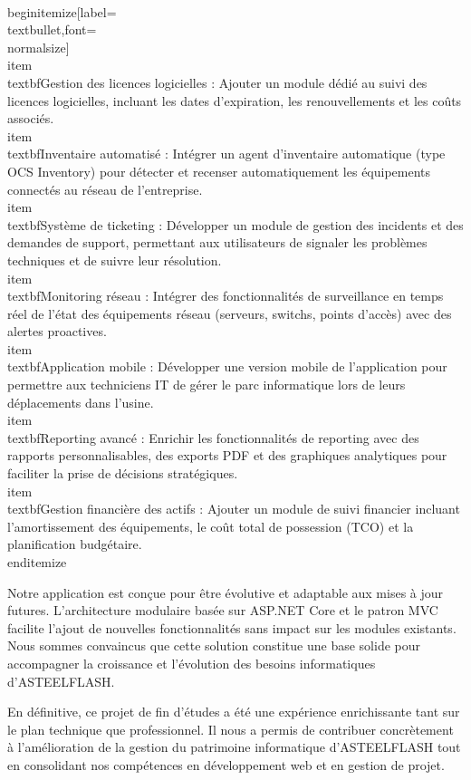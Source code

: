 \\begin{itemize}[label=\\textbullet,font=\\normalsize]
    \\item \\textbf{Gestion des licences logicielles :} Ajouter un module dédié au suivi des licences logicielles, incluant les dates d'expiration, les renouvellements et les coûts associés.
    \\item \\textbf{Inventaire automatisé :} Intégrer un agent d'inventaire automatique (type OCS Inventory) pour détecter et recenser automatiquement les équipements connectés au réseau de l'entreprise.
    \\item \\textbf{Système de ticketing :} Développer un module de gestion des incidents et des demandes de support, permettant aux utilisateurs de signaler les problèmes techniques et de suivre leur résolution.
    \\item \\textbf{Monitoring réseau :} Intégrer des fonctionnalités de surveillance en temps réel de l'état des équipements réseau (serveurs, switchs, points d'accès) avec des alertes proactives.
    \\item \\textbf{Application mobile :} Développer une version mobile de l'application pour permettre aux techniciens IT de gérer le parc informatique lors de leurs déplacements dans l'usine.
    \\item \\textbf{Reporting avancé :} Enrichir les fonctionnalités de reporting avec des rapports personnalisables, des exports PDF et des graphiques analytiques pour faciliter la prise de décisions stratégiques.
    \\item \\textbf{Gestion financière des actifs :} Ajouter un module de suivi financier incluant l'amortissement des équipements, le coût total de possession (TCO) et la planification budgétaire.
\\end{itemize}

Notre application est conçue pour être évolutive et adaptable aux mises à jour futures. L'architecture modulaire basée sur ASP.NET Core et le patron MVC facilite l'ajout de nouvelles fonctionnalités sans impact sur les modules existants. Nous sommes convaincus que cette solution constitue une base solide pour accompagner la croissance et l'évolution des besoins informatiques d'ASTEELFLASH.

En définitive, ce projet de fin d'études a été une expérience enrichissante tant sur le plan technique que professionnel. Il nous a permis de contribuer concrètement à l'amélioration de la gestion du patrimoine informatique d'ASTEELFLASH tout en consolidant nos compétences en développement web et en gestion de projet.

